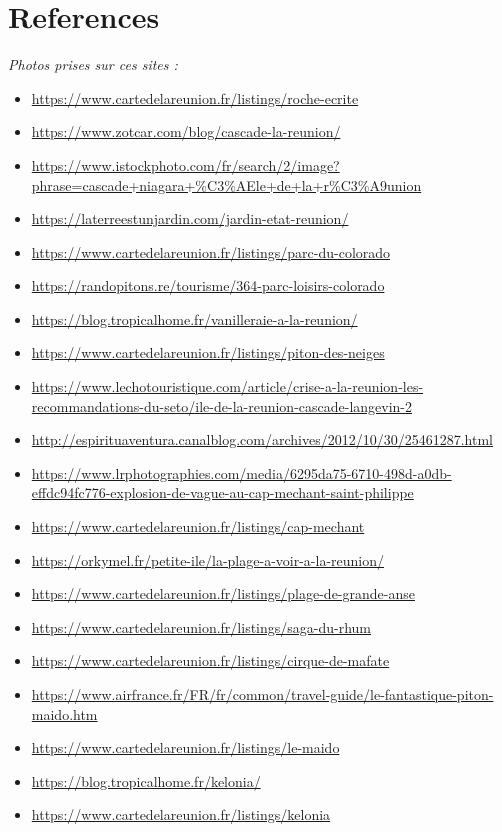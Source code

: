 \documentclass{article}
\begin{document}
{\color{brown}\section{References}}
\label{section:references}
{\color{violet}\itshape Photos prises sur ces sites : }
\begin{itemize}
    \item \url{https://www.cartedelareunion.fr/listings/roche-ecrite}
    \item \url{https://www.zotcar.com/blog/cascade-la-reunion/}
\item \url{https://www.istockphoto.com/fr/search/2/image?phrase=cascade+niagara+\%C3\%AEle+de+la+r\%C3\%A9union}
\item \url{https://laterreestunjardin.com/jardin-etat-reunion/}
\item \url{https://www.cartedelareunion.fr/listings/parc-du-colorado}
\item \url{https://randopitons.re/tourisme/364-parc-loisirs-colorado}
\item \url{https://blog.tropicalhome.fr/vanilleraie-a-la-reunion/}
\item \url{https://www.cartedelareunion.fr/listings/piton-des-neiges}
\item \url{https://www.lechotouristique.com/article/crise-a-la-reunion-les-recommandations-du-seto/ile-de-la-reunion-cascade-langevin-2}
\item \url{http://espirituaventura.canalblog.com/archives/2012/10/30/25461287.html}
\item \url{https://www.lrphotographies.com/media/6295da75-6710-498d-a0db-effdc94fc776-explosion-de-vague-au-cap-mechant-saint-philippe}
\item \url{https://www.cartedelareunion.fr/listings/cap-mechant}
\item \url{https://orkymel.fr/petite-ile/la-plage-a-voir-a-la-reunion/}
\item \url{https://www.cartedelareunion.fr/listings/plage-de-grande-anse}
\item \url{https://www.cartedelareunion.fr/listings/saga-du-rhum}
\item \url{https://www.cartedelareunion.fr/listings/cirque-de-mafate}
\item \url{https://www.airfrance.fr/FR/fr/common/travel-guide/le-fantastique-piton-maido.htm}
\item \url{https://www.cartedelareunion.fr/listings/le-maido}
\item \url{https://blog.tropicalhome.fr/kelonia/}
\item \url{https://www.cartedelareunion.fr/listings/kelonia}

\end{itemize}
\end{document}
